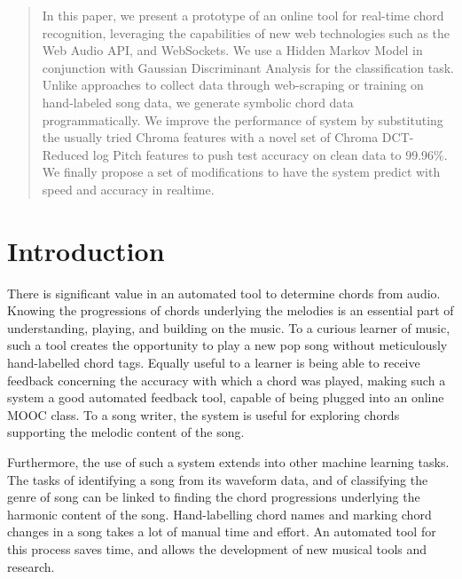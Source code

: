 \documentclass{article}
\begin{document}
 


\begin{abstract} 
In this paper, we present a prototype of an online tool for real-time chord recognition, leveraging the capabilities of new web technologies such as the Web Audio API, and WebSockets. We use a Hidden Markov Model in conjunction with Gaussian Discriminant Analysis for the classification task. Unlike approaches to collect data through web-scraping or training on hand-labeled song data, we generate symbolic chord data programmatically. We improve the performance of system by substituting the usually tried Chroma features with a novel set of Chroma DCT-Reduced log Pitch features to push test accuracy on clean data to 99.96\%. We finally propose a set of modifications to have the system predict with speed and accuracy in realtime. 
\end{abstract} 

\section{Introduction}
\label{intro}
There is significant value in an automated tool to determine chords from audio. Knowing the progressions of chords underlying the melodies is an essential part of understanding, playing, and building on the music. To a curious learner of music, such a tool creates the opportunity to play a new pop song without meticulously hand-labelled chord tags. Equally useful to a learner is being able to receive feedback concerning the accuracy with which a chord was played, making such a system a good automated feedback tool, capable of being plugged into an online MOOC class. To a song writer, the system is useful for exploring chords supporting the melodic content of the song.

Furthermore, the use of such a system extends into other machine learning tasks. The tasks of identifying a song from its waveform data, and of classifying the genre of song can be linked to finding the chord progressions underlying the harmonic content of the song. Hand-labelling chord names and marking chord changes in a song takes a lot of manual time and effort. An automated tool for this process saves time, and allows the development of new musical tools and research.
\end{document}
